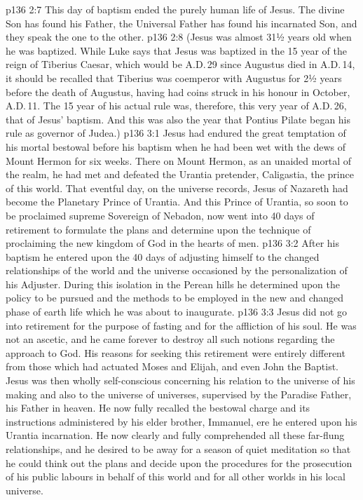 \vs p136 2:7 This day of baptism ended the purely human life of Jesus. The divine Son has found his Father, the Universal Father has found his incarnated Son, and they speak the one to the other.
\vs p136 2:8 \pc (Jesus was almost 31½ years old when he was baptized. While Luke says that Jesus was baptized in the 15 year of the reign of Tiberius Caesar, which would be A.D.\,29 since Augustus died in A.D.\,14, it should be recalled that Tiberius was coemperor with Augustus for 2½ years before the death of Augustus, having had coins struck in his honour in October, A.D.\,11. The 15 year of his actual rule was, therefore, this very year of A.D.\,26, that of Jesus’ baptism. And this was also the year that Pontius Pilate began his rule as governor of Judea.)
\vs p136 3:1 Jesus had endured the great temptation of his mortal bestowal before his baptism when he had been wet with the dews of Mount Hermon for six weeks. There on Mount Hermon, as an unaided mortal of the realm, he had met and defeated the Urantia pretender, Caligastia, the prince of this world. That eventful day, on the universe records, Jesus of Nazareth had become the Planetary Prince of Urantia. And this Prince of Urantia, so soon to be proclaimed supreme Sovereign of Nebadon, now went into 40 days of retirement to formulate the plans and determine upon the technique of proclaiming the new kingdom of God in the hearts of men.
\vs p136 3:2 After his baptism he entered upon the 40 days of adjusting himself to the changed relationships of the world and the universe occasioned by the personalization of his Adjuster. During this isolation in the Perean hills he determined upon the policy to be pursued and the methods to be employed in the new and changed phase of earth life which he was about to inaugurate.
\vs p136 3:3 Jesus did not go into retirement for the purpose of fasting and for the affliction of his soul. He was not an ascetic, and he came forever to destroy all such notions regarding the approach to God. His reasons for seeking this retirement were entirely different from those which had actuated Moses and Elijah, and even John the Baptist. Jesus was then wholly self\hyp{}conscious concerning his relation to the universe of his making and also to the universe of universes, supervised by the Paradise Father, his Father in heaven. He now fully recalled the bestowal charge and its instructions administered by his elder brother, Immanuel, ere he entered upon his Urantia incarnation. He now clearly and fully comprehended all these far\hyp{}flung relationships, and he desired to be away for a season of quiet meditation so that he could think out the plans and decide upon the procedures for the prosecution of his public labours in behalf of this world and for all other worlds in his local universe.
